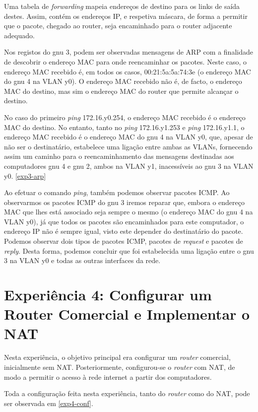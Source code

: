 \documentclass[article, a4paper, 11pt, oneside]{memoir}
\begin{document}
Uma tabela de \textit{forwarding} mapeia endereços de destino para os links de saída destes.
Assim, contém os endereços IP, e respetiva máscara, de forma a permitir que o pacote,
chegado ao router, seja encaminhado para o router adjacente adequado.

Nos registos do gnu 3, podem ser observadas mensagens de ARP com a finalidade de descobrir o endereço
MAC para onde reencaminhar os pacotes. Neste caso, o endereço MAC recebido é, em todos os casos,
00:21:5a:5a:74:3e (o endereço MAC do gnu 4 na VLAN y0). O endereço MAC recebido não é, de facto,
o endereço MAC do destino, mas sim o endereço MAC do router que permite alcançar o destino.

No caso do primeiro \textit{ping} 172.16.y0.254, o endereço MAC recebido é o endereço MAC do destino.
No entanto, tanto no \textit{ping} 172.16.y1.253 e \textit{ping} 172.16.y1.1, o endereço MAC
recebido é o endereço MAC do gnu 4 na VLAN y0, que, apesar de não ser o destinatário,	estabelece uma
ligação entre ambas as VLANs, fornecendo assim um caminho para o reencaminhamento das mensagens
destinadas aos computadores gnu 4 e gnu 2, ambos na VLAN y1, inacessíveis ao gnu 3 na VLAN y0.
\ref{exp3-arp}

Ao efetuar o comando \textit{ping}, também podemos observar pacotes ICMP.
Ao observarmos os pacotes ICMP do gnu 3 iremos reparar que, embora o endereço MAC que lhes está
associado seja sempre o mesmo (o endereço MAC do gnu 4 na VLAN y0), já que todos os
pacotes são encaminhados para este computador, o endereço IP não é sempre igual,
visto este depender do destinatário do pacote.
Podemos observar dois tipos de pacotes ICMP, pacotes de \textit{request} e pacotes de \textit{reply}.
Desta forma, podemos concluir que foi estabelecida uma ligação entre o gnu 3 na VLAN y0 e todas
as outras interfaces da rede.

\section{\textbf{Experiência 4}: Configurar um Router Comercial e Implementar o NAT}

Nesta experiência, o objetivo principal era configurar um \textit{router} comercial, inicialmente
sem NAT. Posteriormente, configurou-se o \textit{router} com NAT, de modo a permitir o acesso
à rede internet a partir dos computadores.

Toda a configuração feita nesta experiência, tanto do \textit{router} como do NAT,
pode ser observada em \ref{exp4-conf}.
\end{document}
